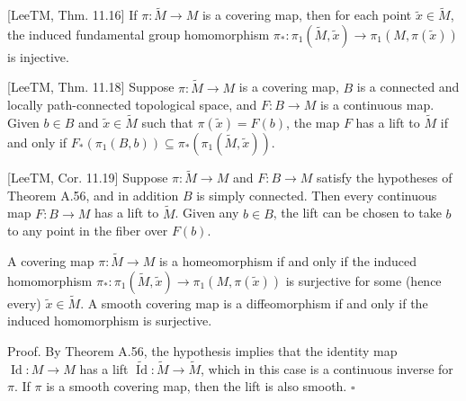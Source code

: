 \begin{theorem}
\label{thm:injectivity-theorem}
[LeeTM, Thm. 11.16] If $\pi: \tilde{M} \to M$ is a covering map, then for each point $\tilde{x} \in \tilde{M}$, the induced fundamental group homomorphism $\pi_*: \pi_1(\tilde{M}, \tilde{x}) \to \pi_1(M, \pi(\tilde{x}))$ is injective.
\end{theorem}

\begin{theorem}
\label{thm:lifting-criterion}
[LeeTM, Thm. 11.18] Suppose $\pi: \tilde{M} \to M$ is a covering map, $B$ is a connected and locally path-connected topological space, and $F: B \to M$ is a continuous map. Given $b \in B$ and $\tilde{x} \in \tilde{M}$ such that $\pi(\tilde{x}) = F(b)$, the map $F$ has a lift to $\tilde{M}$ if and only if $F_*(\pi_1(B,b)) \subseteq \pi_*(\pi_1(\tilde{M}, \tilde{x}))$.
\end{theorem}

\begin{corollary}
\label{cor:lifting-maps-simply-connected}

[LeeTM, Cor. 11.19] Suppose $\pi: \tilde{M} \to M$ and $F: B \to M$ satisfy the hypotheses of Theorem A.56, and in addition $B$ is simply connected. Then every continuous map $F: B \to M$ has a lift to $\tilde{M}$. Given any $b \in B$, the lift can be chosen to take $b$ to any point in the fiber over $F(b)$.
\end{corollary}

\begin{corollary}
\label{cor:covering-map-homeomorphism}

A covering map $\pi: \tilde{M} \to M$ is a homeomorphism if and only if the induced homomorphism $\pi_*: \pi_1(\tilde{M}, \tilde{x}) \to \pi_1(M, \pi(\tilde{x}))$ is surjective for some (hence every) $\tilde{x} \in \tilde{M}$. A smooth covering map is a diffeomorphism if and only if the induced homomorphism is surjective.

Proof. By Theorem A.56, the hypothesis implies that the identity map $\operatorname{Id}: M \to M$ has a lift $\widetilde{\operatorname{Id}}: \tilde{M} \to \tilde{M}$, which in this case is a continuous inverse for $\pi$. If $\pi$ is a smooth covering map, then the lift is also smooth. $\square$
\end{corollary}


